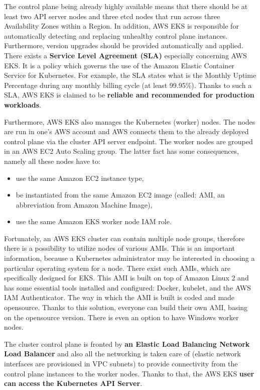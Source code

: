 The control plane being already highly available means that there should be at least two API server nodes and three etcd nodes that run across three Availability Zones within a Region. In addition, AWS EKS is responsible for automatically detecting and replacing unhealthy control plane instances. Furthermore, version upgrades should be provided automatically and applied\cite{what-is-eks}. There exists a \textbf{Service Level Agreement (SLA)} especially concerning AWS EKS. It is a policy which governs the use of the Amazon Elastic Container Service for Kubernetes. For example, the SLA states what is the Monthly Uptime Percentage during any monthly billing cycle (at least 99.95\%)\cite{eks-sla}. Thanks to such a SLA, AWS EKS is claimed to be \textbf{reliable and recommended for production workloads}\cite{what-is-eks}.

Furthermore, AWS EKS also manages the Kubernetes (worker) nodes. The nodes are run in one's AWS account and AWS connects them to the already deployed control plane via the cluster API server endpoint. The worker nodes are grouped in an AWS EC2 Auto Scaling group. The latter fact has some consequences, namely all these nodes have to\cite{eks-worker}:
\begin{itemize}
\item use the same Amazon EC2 instance type,
\item be instantiated from the same Amazon EC2 image (called: AMI, an abbreviation from Amazon Machine Image\cite{aws-ami}),
\item use the same Amazon EKS worker node IAM role.
\end{itemize}

Fortunately, an AWS EKS cluster can contain multiple node groups, therefore there is a possibility to utilize nodes of various AMIs\cite{eks-worker}. This is an important information, because a Kubernetes administrator may be interested in choosing a particular operating system for a node. There exist such AMIs, which are specifically designed for EKS. This AMI is built on top of Amazon Linux 2 and has some essential tools installed and configured: Docker, kubelet, and the AWS IAM Authenticator. The way in which the AMI is built is coded and made opensource. Thanks to this solution, everyone can build their own AMI, basing on the opensource version\cite{eks-optimized-ami}. There is even an option to have Windows worker nodes\cite{eks-worker-win}.

The cluster control plane is fronted by \textbf{an Elastic Load Balancing Network Load Balancer} and also all the networking is taken care of (elastic network interfaces are provisioned in VPC subnets) to provide connectivity from the control plane instances to the worker nodes. Thanks to that, the AWS EKS \textbf{user can access the Kubernetes API Server}\cite{eks-clusters}.


